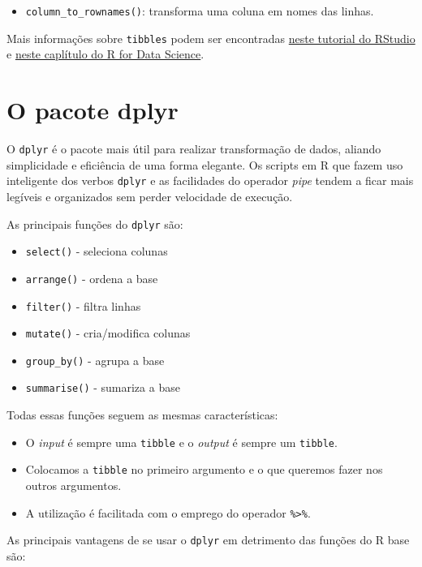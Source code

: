 \documentclass[
]{book}
\providecommand{\tightlist}{%
  \setlength{\itemsep}{0pt}\setlength{\parskip}{0pt}}
\begin{document}
\begin{itemize}
\tightlist
\item
  \texttt{column\_to\_rownames()}: transforma uma coluna em nomes das linhas.
\end{itemize}

Mais informações sobre \texttt{tibbles} podem ser encontradas \href{https://tibble.tidyverse.org/}{neste tutorial do RStudio} e \href{http://r4ds.had.co.nz/tibbles.html}{neste caplítulo do R for Data Science}.

\hypertarget{dplyr}{%
\section{O pacote dplyr}\label{dplyr}}

O \texttt{dplyr} é o pacote mais útil para realizar transformação de dados, aliando simplicidade e eficiência de uma forma elegante. Os scripts em R que fazem uso inteligente dos verbos \texttt{dplyr} e as facilidades do operador \emph{pipe} tendem a ficar mais legíveis e organizados sem perder velocidade de execução.

As principais funções do \texttt{dplyr} são:

\begin{itemize}
\tightlist
\item
  \texttt{select()} - seleciona colunas
\item
  \texttt{arrange()} - ordena a base
\item
  \texttt{filter()} - filtra linhas
\item
  \texttt{mutate()} - cria/modifica colunas
\item
  \texttt{group\_by()} - agrupa a base
\item
  \texttt{summarise()} - sumariza a base
\end{itemize}

Todas essas funções seguem as mesmas características:

\begin{itemize}
\tightlist
\item
  O \emph{input} é sempre uma \texttt{tibble} e o \emph{output} é sempre um \texttt{tibble}.
\item
  Colocamos a \texttt{tibble} no primeiro argumento e o que queremos fazer nos outros argumentos.
\item
  A utilização é facilitada com o emprego do operador \texttt{\%\textgreater{}\%}.
\end{itemize}

As principais vantagens de se usar o \texttt{dplyr} em detrimento das funções do R base são:
\end{document}

